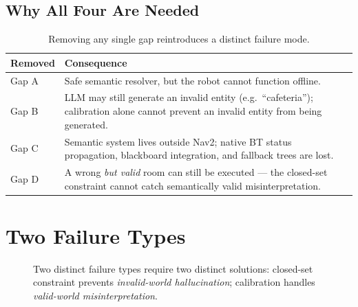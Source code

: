\documentclass[11pt,a4paper]{article}
\begin{document}
\subsection{Why All Four Are Needed}

\begin{table}[h]
\centering
\begin{tabular}{@{}p{2.1cm}p{10.6cm}@{}}
\toprule
\textbf{Removed} & \textbf{Consequence} \\
\midrule
Gap A & Safe semantic resolver, but the robot cannot function offline. \\
Gap B & LLM may still generate an invalid entity (e.g.\ ``cafeteria''); calibration alone cannot prevent an invalid entity from being generated. \\
Gap C & Semantic system lives outside Nav2; native BT status propagation, blackboard integration, and fallback trees are lost. \\
Gap D & A wrong \emph{but valid} room can still be executed --- the closed-set constraint cannot catch semantically valid misinterpretation. \\
\bottomrule
\end{tabular}
\caption{Removing any single gap reintroduces a distinct failure mode.}
\end{table}

\section{Two Failure Types}
\label{sec:failures}

\begin{figure}[h]
\centering
{}
\caption{Two distinct failure types require two distinct solutions: closed-set constraint prevents \emph{invalid-world hallucination}; calibration handles \emph{valid-world misinterpretation}.}
\end{figure}
\end{document}
